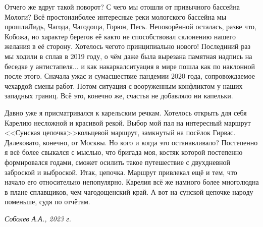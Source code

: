 {Отчего же вдруг такой поворот? С чего мы отошли от привычного бассейна Мологи\cite{СоболевВепсскаяЛетопись}? Всё просто\mdash наиболее интересные реки мологского бассейна мы прошли\mdash Лидь, Чагода, Чагодоща, Горюн, Песь. Непокорённой осталась, разве что, Кобожа, но характер берегов её как\sdash то не способствовал склонению нашего желания в её сторону. Хотелось чего\sdash то принципиально нового! Последнний раз мы ходили в сплав в 2019 году, о чём даже была вырезана памятная надпись на беседке у антистапеля$\ldots$ и как накаркал\mdash ситуация в мире пошла как по наклонной после этого. Сначала ужас и сумасшествие пандемии 2020 года, сопровождаемое чехардой смены работ. Потом ситуация с вооруженным конфликтом у наших западных границ. Всё это, конечно же, счастья не добавляло ни капельки. 

Давно уже я присматривался к карельским речкам. Хотелось открыть для себя Карелию несложной и красивой рекой. Выбор мой пал на интересный маршрут <<Сунская цепочка>>\mdash кольцевой маршрут, замкнутый на посёлок Гирвас. Далековато, конечно, от Москвы. Но кого и когда это останавливало? Постепенно я всё более свыкался с мыслью, что бригада моя, костяк которой постепенно формировался годами, сможет осилить такое путешествие с двухдневной заброской и выброской. Итак, цепочка. Маршрут привлекал ещё и тем, что начало его относительно непопулярно. Карелия всё же намного более многолюдна в плане сплавщиков, чем чагодощенский край. А вот на сунской цепочке народу поменьше, судя по отчётам.

\begin{flushright}
	\textit{Соболев А.А., 2023 г.}
\end{flushright}

}
\fancyhead[LE]{\fancyplain{}{\bfseries \parttitle}}
\fancyhead[RO]{\fancyplain{}{\bfseries \rightmark}}